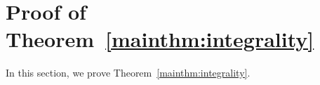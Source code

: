 \documentclass[a4paper, 11pt, twoside, leqno]{article}
\newtheorem{theorem}{Theorem}           %
\theoremstyle{definition}              %
\theoremstyle{remark}                  %
\newtheorem{remark}{Remark}
\renewcommand{\d}{\mathrm{d}}
\renewcommand{\H}{\mathscr{H}}
\newcommand{\eps}{\varepsilon}
\newcommand{\bbV}{\mathbb{V}}
\renewcommand{\v}{\mathbf{v}}
\newcommand{\mres}{\mathbin{\vrule height 1.6ex depth 0pt width
0.13ex\vrule height 0.13ex depth 0pt width 1.3ex}}
\begin{document}
%


\section{Proof of Theorem~\ref{mainthm:integrality}}\label{sec:integrality}

In this section, we prove Theorem~\ref{mainthm:integrality}.
\end{document}
